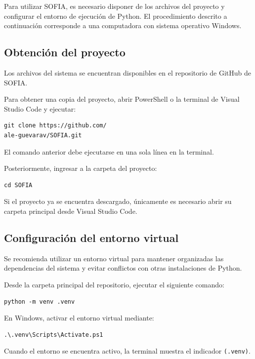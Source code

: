 \documentclass[letterpaper,journal]{IEEEtran}
\begin{document}
Para utilizar SOFIA, es necesario disponer de los
archivos del proyecto y configurar el entorno de
ejecución de Python. El procedimiento descrito
a continuación corresponde a una computadora
con sistema operativo Windows.

\subsection{Obtención del proyecto}

Los archivos del sistema se encuentran disponibles
en el repositorio de GitHub de SOFIA.

Para obtener una copia del proyecto, abrir PowerShell
o la terminal de Visual Studio Code y ejecutar:

\begin{verbatim}
git clone https://github.com/
ale-guevarav/SOFIA.git
\end{verbatim}

El comando anterior debe ejecutarse en una sola
línea en la terminal.

Posteriormente, ingresar a la carpeta del proyecto:

\begin{verbatim}
cd SOFIA
\end{verbatim}

Si el proyecto ya se encuentra descargado, únicamente
es necesario abrir su carpeta principal desde
Visual Studio Code.

\subsection{Configuración del entorno virtual}

Se recomienda utilizar un entorno virtual para
mantener organizadas las dependencias del sistema
y evitar conflictos con otras instalaciones
de Python.

Desde la carpeta principal del repositorio,
ejecutar el siguiente comando:

\begin{verbatim}
python -m venv .venv
\end{verbatim}

En Windows, activar el entorno virtual mediante:

\begin{verbatim}
.\.venv\Scripts\Activate.ps1
\end{verbatim}

Cuando el entorno se encuentra activo, la terminal
muestra el indicador \texttt{(.venv)}.
\end{document}
